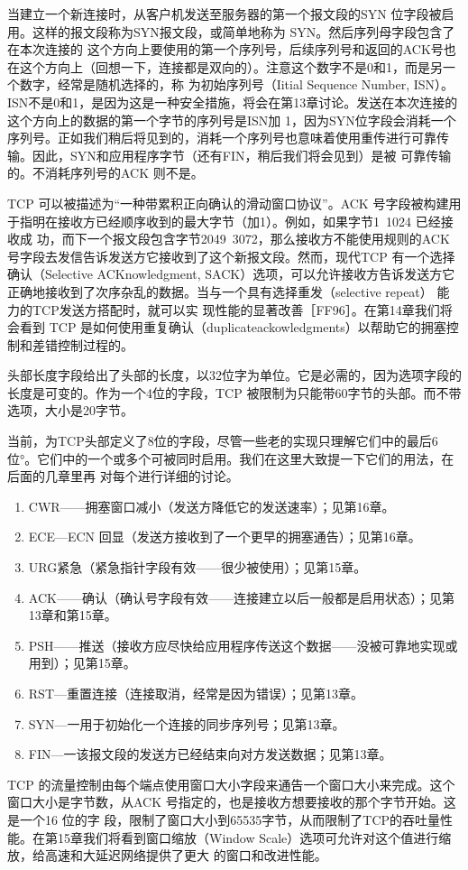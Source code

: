 当建立一个新连接时，从客户机发送至服务器的第一个报文段的SYN 位字段被启用。这样的报文段称为SYN报文段，或简单地称为 SYN。然后序列母字段包含了在本次连接的
这个方向上要使用的第一个序列号，后续序列号和返回的ACK号也在这个方向上（回想一下，连接都是双向的）。注意这个数字不是0和1，而是另一个数字，经常是随机选择的，称
为初始序列号（Iitial Sequence Number, ISN）。ISN不是0和1，是因为这是一种安全措施，将会在第13章讨论。发送在本次连接的这个方向上的数据的第一个字节的序列号是ISN加
1，因为SYN位字段会消耗一个序列号。正如我们稍后将见到的，消耗一个序列号也意味着使用重传进行可靠传输。因此，SYN和应用程序字节（还有FIN，稍后我们将会见到）是被
可靠传输的。不消耗序列号的ACK 则不是。

TCP 可以被描述为“一种带累积正向确认的滑动窗口协议”。ACK 号字段被构建用于指明在接收方已经顺序收到的最大字节（加1）。例如，如果字节1~1024 已经接收成
功，而下一个报文段包含字节2049~3072，那么接收方不能使用规则的ACK 号字段去发信告诉发送方它接收到了这个新报文段。然而，现代TCP 有一个选择确认（Selective
ACKnowledgment, SACK）选项，可以允许接收方告诉发送方它正确地接收到了次序杂乱的数据。当与一个具有选择重发（selective repeat） 能力的TCP发送方搭配时，就可以实
现性能的显著改善［FF96］。在第14章我们将会看到 TCP 是如何使用重复确认（duplicateackowledgments）以帮助它的拥塞控制和差错控制过程的。

头部长度字段给出了头部的长度，以32位字为单位。它是必需的，因为选项字段的长度是可变的。作为一个4位的字段，TCP 被限制为只能带60字节的头部。而不带选项，大小是20字节。

当前，为TCP头部定义了8位的字段，尽管一些老的实现只理解它们中的最后6位°。它们中的一个或多个可被同时启用。我们在这里大致提一下它们的用法，在后面的几章里再
对每个进行详细的讨论。

\begin{enumerate}
    \item CWR——拥塞窗口减小（发送方降低它的发送速率）；见第16章。
    \item ECE—ECN 回显（发送方接收到了一个更早的拥塞通告）；见第16章。
    \item URG紧急（紧急指针字段有效——很少被使用）；见第15章。
    \item ACK——确认（确认号字段有效——连接建立以后一般都是启用状态）；见第13章和第15章。
    \item PSH——推送（接收方应尽快给应用程序传送这个数据——没被可靠地实现或用到）；见第15章。
    \item RST—重置连接（连接取消，经常是因为错误）；见第13章。
    \item SYN—一用于初始化一个连接的同步序列号；见第13章。
    \item FIN—一该报文段的发送方已经结束向对方发送数据；见第13章。
\end{enumerate}
TCP 的流量控制由每个端点使用窗口大小字段来通告一个窗口大小来完成。这个窗口大小是字节数，从ACK 号指定的，也是接收方想要接收的那个字节开始。这是一个16 位的字
段，限制了窗口大小到65535字节，从而限制了TCP的吞吐量性能。在第15章我们将看到窗口缩放（Window Scale）选项可允许对这个值进行缩放，给高速和大延迟网络提供了更大
的窗口和改进性能。

